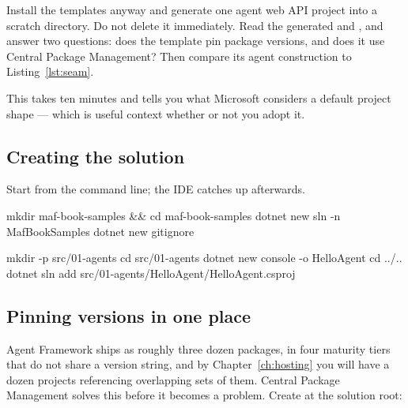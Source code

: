 \begin{exercisebox}
Install the templates anyway and generate one agent web API project into a
scratch directory. Do not delete it immediately. Read the generated
 and , and answer two questions: does the template
pin package versions, and does it use Central Package Management? Then compare
its agent construction to Listing~\ref{lst:seam}.

This takes ten minutes and tells you what Microsoft considers a default project
shape --- which is useful context whether or not you adopt it.
\end{exercisebox}

\subsection{Creating the solution}

Start from the command line; the IDE catches up afterwards.

\begin{shellcmd}
mkdir maf-book-samples && cd maf-book-samples
dotnet new sln -n MafBookSamples
dotnet new gitignore

mkdir -p src/01-agents
cd src/01-agents
dotnet new console -o HelloAgent
cd ../..
dotnet sln add src/01-agents/HelloAgent/HelloAgent.csproj
\end{shellcmd}

\subsection{Pinning versions in one place}

Agent Framework ships as roughly three dozen packages, in four maturity tiers
that do not share a version string, and by Chapter~\ref{ch:hosting} you will have
a dozen projects referencing overlapping sets of them. Central Package Management
solves this before it becomes a problem. Create 
at the solution root:

